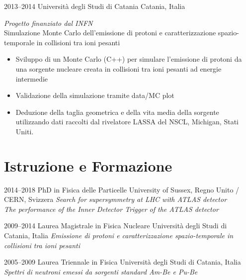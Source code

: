\documentclass[print]{cv} %
\begin{document}
  \begin{entrylist}
    \entry
    {2013--2014}
    {Università degli Studi di Catania}
    {Catania, Italia}
    {\emph{Progetto finanziato dal INFN}\\
      Simulazione Monte Carlo dell'emissione di protoni e caratterizzazione spazio-temporale in collisioni tra ioni pesanti 
      \begin{itemize}
        \item Sviluppo di un Monte Carlo (C++) per simulare l'emissione di protoni da una sorgente nucleare creata in collisioni tra ioni pesanti ad energie intermedie 
        \item Validazione della simulazione tramite data/MC plot
        \item Deduzione della taglia geometrica e della vita media della sorgente utilizzando dati raccolti dal rivelatore LASSA del NSCL, Michigan, Stati Uniti. 
      \end{itemize}
      }

\end{entrylist}

\section{Istruzione e Formazione}

\begin{entrylist}

  \entry
      {2014--2018}
      {PhD {\normalfont in Fisica delle Particelle}}
      {University of Sussex, Regno Unito / CERN, Svizzera}
      {\emph{Search for supersymmetry at LHC with ATLAS detector\\
      The performance of the Inner Detector Trigger of the ATLAS detector}
      }

  \entry
      {2009--2014}
      {Laurea Magistrale {\normalfont in Fisica Nucleare}}
      {Università degli Studi di Catania, Italia}
      {\emph{Emissione di protoni e caratterizzazione spazio-temporale in collisioni tra ioni pesanti} }

  \entry
      {2005--2009}
      {Laurea Triennale {\normalfont in Fisica}}
      {Università degli Studi di Catania, Italia}
      {\emph{Spettri di neutroni emessi da sorgenti standard Am-Be e Pu-Be} }
\end{entrylist}
\end{document}
